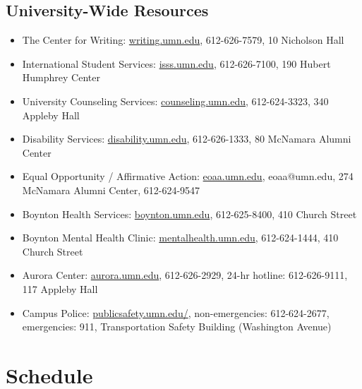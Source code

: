 \documentclass[12pt]{article}
\begin{document}
\subsection{University-Wide Resources}
\begin{itemize}
    \item The Center for Writing: \href{http://writing.umn.edu/}{writing.umn.edu}, 612-626-7579, 10 Nicholson Hall
    \item International Student Services: \href{https://isss.umn.edu/}{isss.umn.edu}, 612-626-7100, 190 Hubert Humphrey Center
    \item University Counseling Services: \href{https://counseling.umn.edu/}{counseling.umn.edu}, 612-624-3323, 340 Appleby Hall

    \item Disability Services: \href{https://disability.umn.edu/}{disability.umn.edu}, 612-626-1333, 80 McNamara Alumni Center
    \item Equal Opportunity / Affirmative Action: \href{https://eoaa.umn.edu/}{eoaa.umn.edu}, eoaa@umn.edu, 274 McNamara Alumni Center, 612-624-9547
    \item Boynton Health Services: \href{https://boynton.umn.edu/}{boynton.umn.edu}, 612-625-8400, 410 Church Street
    \item Boynton Mental Health Clinic: \href{http://mentalhealth.umn.edu/}{mentalhealth.umn.edu}, 612-624-1444, 410 Church Street
    \item Aurora Center: \href{http://aurora.umn.edu/}{aurora.umn.edu}, 612-626-2929, 24-hr hotline: 612-626-9111, 117 Appleby Hall
    \item Campus Police: \href{https://publicsafety.umn.edu/}{publicsafety.umn.edu/}, non-emergencies: 612-624-2677, emergencies: 911, Transportation Safety Building (Washington Avenue)
\end{itemize}

\newpage

\section{Schedule}
\end{document}
